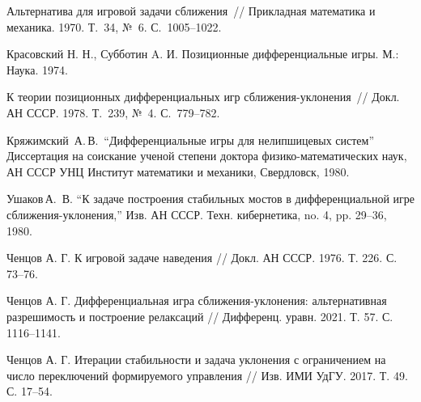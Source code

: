 

%

%

\begin{thebibliography}{9} %


 Альтернатива для игровой задачи сближения~// Прикладная математика и механика. 1970. Т.~34, {№}~6. С.~1005--1022.

 Красовский Н. Н., Субботин A. И. Позиционные дифференциальные игры. М.: Наука. 1974.

 К теории позиционных дифференциальных игр сбли\-же\-ния-ук\-ло\-не\-ния~// Докл. АН СССР. 1978. Т.~239, {№}~4. С.~779--782.

Кряжимский~А.\,В.\, “Дифференциальные игры для нелипшицевых систем” Диссертация на соискание ученой степени доктора физико-математических наук, АН СССР УНЦ Институт математики и механики, Свердловск, 1980.

 Ушаков\,А.\, В. “К задаче построения стабильных мостов в дифференциальной игре сближения-уклонения,” Изв. АН СССР. Техн. кибернетика, no. 4, pp. 29–36, 1980.

 Ченцов А. Г. К игровой задаче наведения // Докл. АН СССР. 1976. Т. 226. С. 73–76.

Ченцов А. Г. Дифференциальная игра сближения-уклонения: альтернативная разрешимость и построение релаксаций // Дифференц. уравн. 2021. Т. 57. С. 1116–1141.

 Ченцов А. Г. Итерации стабильности и задача уклонения с ограничением на число переключений формируемого управления // Изв. ИМИ УдГУ. 2017. Т. 49. С. 17–54.


\end{thebibliography}





%

